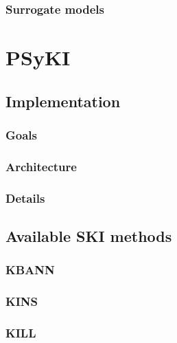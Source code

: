 \documentclass[12pt,a4paper,openright,twoside]{book}
\begin{document}
\subsection{Surrogate models}\label{subsec:surrogate-models}


\chapter{\Acl{PSyKI}}\label{ch:psyki}

\section{Implementation}\label{sec:implementation}

\subsection{Goals}\label{subsec:goals}

\subsection{Architecture}\label{subsec:architecture}

\subsection{Details}\label{subsec:details}

\section{Available \ac{SKI} methods}\label{sec:available-ski-methods}

\subsection{\Acl{KBANN}}\label{subsec:kbann}

\subsection{\Acl{KINS}}\label{subsec:kins}

\subsection{\Acl{KILL}}\label{subsec:kill}
\end{document}
